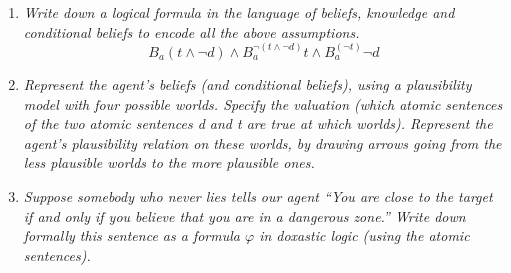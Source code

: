 \documentclass[leqno]{article}
\begin{document}
\begin{enumerate}
    \item \textit{Write down a logical formula in the language of beliefs,
    knowledge and conditional beliefs to encode all the above assumptions.}
    \[
        B_a(t \wedge \neg d) \wedge
        B_a^{ \neg (t \wedge \neg d)} t \wedge
        B_a^{(\neg t)} \neg d
    \]

    \item \textit{Represent the agent’s beliefs (and conditional beliefs),
    using a plausibility model with four possible worlds. Specify the valuation
    (which atomic sentences of the two atomic sentences d and t are true at
    which worlds). Represent the agent’s plausibility relation on these worlds,
    by drawing arrows going from the less plausible worlds to the more plausible
    ones.}

    \begin{center}
    \end{center}

    \item \textit{Suppose somebody who never lies tells our agent “You are
    close to the target if and only if you believe that you are in a dangerous
    zone.” Write down formally this sentence as a formula $\varphi$ in doxastic
    logic (using the atomic sentences).}


\end{enumerate}
\end{document}
